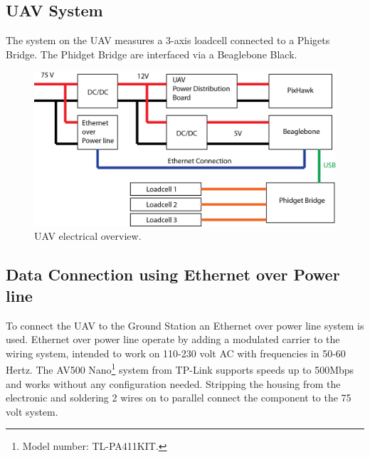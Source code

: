 \subsection{UAV System}
The system on the UAV measures a 3-axis loadcell connected to a Phigets Bridge. The Phidget Bridge are interfaced via a Beaglebone Black.  

\begin{figure}[hbtp]
\centering
\includegraphics[scale=0.75]{graphics/UAV-electrical-system.png}
\caption{UAV electrical overview.}
\end{figure}



\subsection{Data Connection using Ethernet over Power line}
To connect the UAV to the Ground Station an Ethernet over power line system is used. Ethernet over power line operate by adding a modulated carrier to the wiring system, intended to work on 110-230 volt AC with frequencies in 50-60 Hertz. The AV500 Nano\footnote{Model number: TL-PA411KIT.} system from TP-Link supports speeds up to 500Mbps and works without any configuration needed. Stripping the housing from the electronic and soldering 2 wires on to parallel connect the component to the 75 volt system. 

